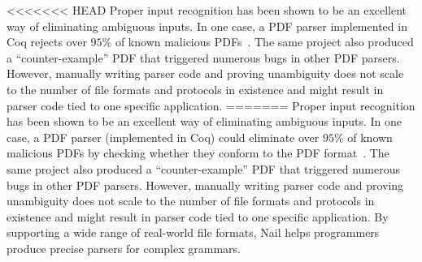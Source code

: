 


<<<<<<< HEAD
Proper input recognition has been shown to be an excellent way of eliminating ambiguous inputs. In
one case, a PDF parser implemented in Coq rejects over $95\%$ of known malicious
PDFs~\cite{Bogk-PDF}. The same project also produced a ``counter-example'' PDF that triggered
numerous bugs in other PDF parsers. However, manually writing parser code and proving unambiguity
does not scale to the number of file formats and protocols in existence and might result in parser
code tied to one specific application.
=======
Proper input recognition has been shown to be an excellent way of
eliminating ambiguous inputs.  In one case, a PDF parser (implemented
in Coq) could eliminate over $95\%$ of known malicious PDFs by checking
whether they conform to the PDF format~\cite{Bogk-PDF}. The same project
also produced a ``counter-example'' PDF that triggered numerous bugs
in other PDF parsers. However, manually writing parser code and proving
unambiguity does not scale to the number of file formats and protocols
in existence and might result in parser code tied to one specific
application. By supporting a wide range of real-world file formats,
Nail helps programmers produce precise parsers for complex grammars.


